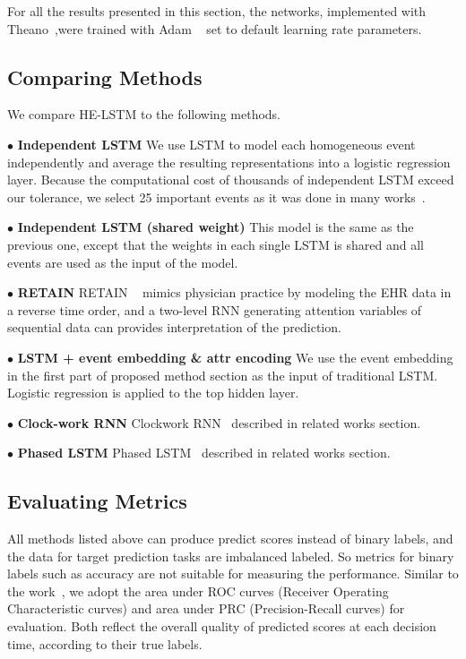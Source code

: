\documentclass[letterpaper]{article} %
\begin{document}
For all
the results presented in this section, the networks, implemented with Theano~\cite{bergstra2010theano},were trained with Adam ~\cite{Kingma2014Adam} set to default learning rate
parameters.


\subsection{Comparing Methods}
We compare HE-LSTM to the following methods.

$\bullet$ \textbf{Independent LSTM}
We use LSTM to model each homogeneous event independently and average the resulting representations into a logistic regression layer. Because the computational cost of thousands of independent LSTM exceed our tolerance, we select 25 important events as it was done in many works~\cite{alaa2017learning}.

$\bullet$ \textbf{Independent LSTM (shared weight)}
This model is the same as the previous one, except that the weights in each single LSTM is shared and all events are used as the input of the model.


$\bullet$ \textbf{RETAIN}
RETAIN ~\cite{choi2016retain} mimics physician practice by modeling the EHR data in a reverse time order, and a two-level RNN generating attention variables of sequential data can provides interpretation of the prediction.


$\bullet$ \textbf{LSTM + event embedding \& attr encoding}
We use the event embedding in the first part of proposed method section as the input of traditional LSTM. Logistic regression is applied to the top hidden layer.


$\bullet$ \textbf{Clock-work RNN}
Clockwork RNN~\cite{koutnik2014clockwork} described in related works
section.

$\bullet$ \textbf{Phased LSTM}
Phased LSTM~\cite{neil2016phased} described in related works section.



\subsection{Evaluating Metrics}
All methods listed above can produce predict scores instead of binary labels, and the data for target prediction tasks are imbalanced labeled. So metrics for binary labels such as accuracy are not suitable for measuring the performance. Similar to the work~\cite{choi2016retain,Liu2015Temporal}, we adopt the area under ROC curves (Receiver Operating Characteristic curves) and area under PRC (Precision-Recall curves) for evaluation. Both reflect the overall quality of predicted scores at each decision time, according to their true labels.
\end{document}

